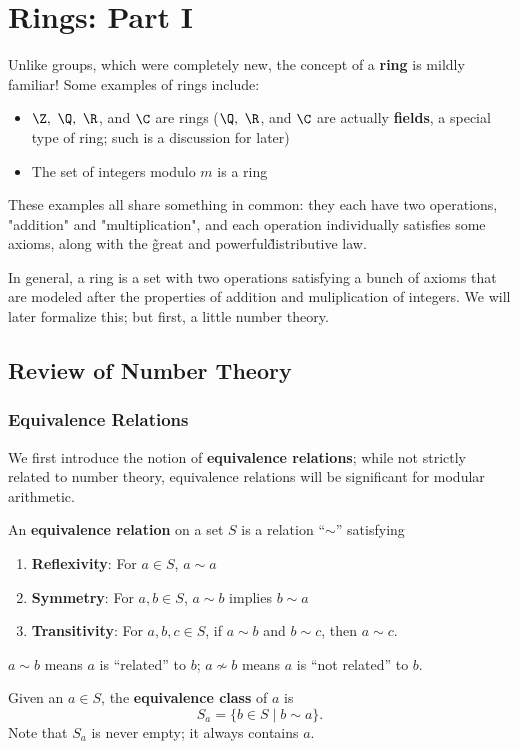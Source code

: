 \documentclass[math1530-lecture-notes]{subfiles}
\begin{document}
\chapter{Rings: Part I}

Unlike groups, which were completely new, the concept of a \textbf{ring} is mildly familiar! Some
examples of rings include:
\begin{itemize}
  \item $\Z,\ \Q,\ \R$, and $\C$ are rings ($\Q,\ \R$, and $\C$ are actually \textbf{fields}, a
    special type of ring; such is a discussion for later)
  \item The set of integers modulo $m$ is a ring
\end{itemize}

These examples all share something in common: they each have two operations, "addition" and
"multiplication", and each operation individually satisfies some axioms, along with the \~great and
powerful\~ distributive law.

In general, a ring is a set with two operations satisfying a bunch of axioms that are modeled after
the properties of addition and muliplication of integers. We will later formalize this; but first, a
little number theory.

\section{Review of Number Theory}

\subsection{Equivalence Relations}

We first introduce the notion of \textbf{equivalence relations}; while not strictly related to
number theory, equivalence relations will be significant for modular arithmetic.

\begin{definition}{}
  An \textbf{equivalence relation} on a set $S$ is a relation ``$\sim $'' satisfying
  \begin{enumerate}
    \item \textbf{Reflexivity}: For $a\in S$, $a\sim a$
    \item \textbf{Symmetry}: For $a,b\in S$, $a\sim b$ implies $b\sim a$ 
    \item \textbf{Transitivity}: For $a,b,c\in S$, if $a\sim b$ and $b\sim c$, then $a\sim c$.
  \end{enumerate}
  $a\sim b$ means $a$ is ``related'' to $b$; $a\not\sim b$ means $a$ is ``not related'' to $b$.

  Given an $a\in S$, the \textbf{equivalence class} of $a$ is \[
    S_a = \{b\in S\mid b\sim a\} 
  .\] Note that $S_a$ is never empty; it always contains $a$.
\end{definition}
\end{document}
